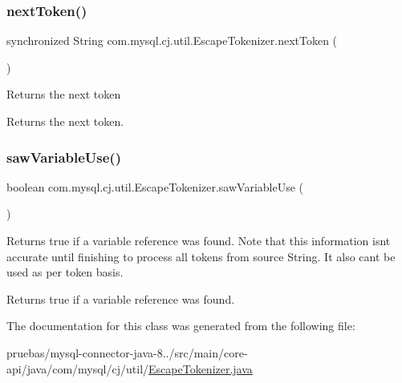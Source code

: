 \subsubsection{\texorpdfstring{next\+Token()}{nextToken()}}
{\footnotesize\ttfamily synchronized String com.\+mysql.\+cj.\+util.\+Escape\+Tokenizer.\+next\+Token (\begin{DoxyParamCaption}{ }\end{DoxyParamCaption})}

Returns the next token

\begin{DoxyReturn}{Returns}
the next token. 
\end{DoxyReturn}
\mbox{\label{classcom_1_1mysql_1_1cj_1_1util_1_1_escape_tokenizer_aaccac986d9952cb8c00f2f0d06271022}} 
\subsubsection{\texorpdfstring{saw\+Variable\+Use()}{sawVariableUse()}}
{\footnotesize\ttfamily boolean com.\+mysql.\+cj.\+util.\+Escape\+Tokenizer.\+saw\+Variable\+Use (\begin{DoxyParamCaption}{ }\end{DoxyParamCaption})}

Returns true if a variable reference was found. Note that this information isn\textquotesingle{}t accurate until finishing to process all tokens from source String. It also can\textquotesingle{}t be used as per token basis.

\begin{DoxyReturn}{Returns}
true if a variable reference was found. 
\end{DoxyReturn}


The documentation for this class was generated from the following file\+:\begin{DoxyCompactItemize}
\item 
pruebas/mysql-\/connector-\/java-\/8../src/main/core-\/api/java/com/mysql/cj/util/\mbox{\hyperlink{_escape_tokenizer_8java}{Escape\+Tokenizer.\+java}}\end{DoxyCompactItemize}
